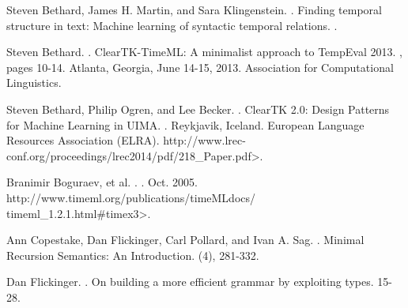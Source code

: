 \documentclass[11pt]{article}
\begin{document}
\begin{thebibliography}{}

Steven Bethard, James H. Martin, and Sara Klingenstein.
.
\newblock Finding temporal structure in text: Machine learning of syntactic temporal relations.
.

Steven Bethard.
.
\newblock ClearTK-TimeML: A minimalist approach to TempEval 2013.
, pages 10-14.
\newblock Atlanta, Georgia, June 14-15, 2013.
\newblock Association for Computational Linguistics.

Steven Bethard, Philip Ogren, and Lee Becker.
.
\newblock ClearTK 2.0: Design Patterns for Machine Learning in UIMA.
.
\newblock Reykjavik, Iceland.
\newblock European Language Resources Association (ELRA).
\newblock {\textless}http://www.lrec-conf.org/proceedings/lrec2014/pdf/218\_Paper.pdf{\textgreater}.

Branimir Boguraev, et al.
.
.
\newblock Oct. 2005.
\newblock {\textless}http://www.timeml.org/publications/timeMLdocs/\\timeml\_1.2.1.html\#timex3{\textgreater}.


Ann Copestake, Dan Flickinger, Carl Pollard, and Ivan A. Sag.
.
\newblock Minimal Recursion Semantics: An Introduction.
(4), 281-332.


Dan Flickinger.
.
\newblock On building a more efficient grammar by exploiting types.
 15-28.


\end{thebibliography}
\end{document}
